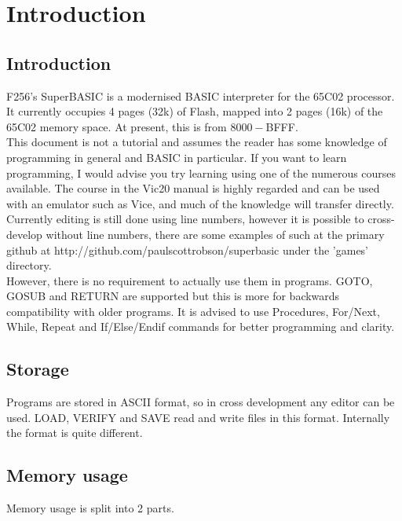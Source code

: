 \chapter{Introduction}

\section{Introduction}

F256's SuperBASIC is a modernised BASIC interpreter for the 65C02 processor. It currently occupies 4 pages (32k) of Flash, mapped into 2 pages (16k) of the 65C02 memory space. At present, this is from $8000-$BFFF.\\

This document is not a tutorial and assumes the reader has some knowledge of programming in general and BASIC in particular. If you want to learn programming, I would advise you try learning using one of the numerous courses available. The course in the Vic20 manual is highly regarded and can be used with an emulator such as Vice, and much of the knowledge will transfer directly.\\

Currently editing is still done using line numbers, however it is possible to cross-develop without line numbers, there are some examples of such at the primary github at http://github.com/paulscottrobson/superbasic under the 'games' directory.\\

However, there is no requirement to actually use them in programs. GOTO, GOSUB and RETURN are supported but this is more for backwards compatibility with older programs. It is advised to use Procedures, For/Next, While, Repeat and If/Else/Endif commands for better programming and clarity.\\

\section{Storage}

Programs are stored in ASCII format, so in cross development any editor can be used. LOAD, VERIFY and SAVE read and write files in this format. Internally the format is quite different.

\section{Memory usage}

Memory usage is split into 2 parts. \\

